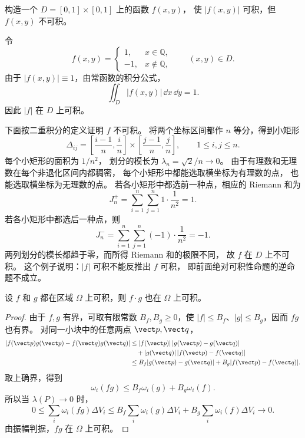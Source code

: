 \begin{problem}\label{p2-absolute-value-converse-counterexample}
构造一个 $D=[0,1]\times[0,1]$ 上的函数 $f(x,y)$，
使 $|f(x,y)|$ 可积，但 $f(x,y)$ 不可积。
\end{problem}
\begin{solution}
令
\[
f(x,y)=
\begin{cases}
1,&x\in\mathbb Q,\\
-1,&x\notin\mathbb Q,
\end{cases}
\qquad (x,y)\in D.
\]
由于 $|f(x,y)|\equiv1$，由常函数的积分公式，
\[
\iint_D|f(x,y)|\,\dd x\,\dd y=1.
\]
因此 $|f|$ 在 $D$ 上可积。

下面按二重积分的定义证明 $f$ 不可积。
将两个坐标区间都作 $n$ 等分，得到小矩形
\[
\Delta_{ij}=
\left[\frac{i-1}{n},\frac{i}{n}\right]
\times\left[\frac{j-1}{n},\frac{j}{n}\right],
\qquad 1\le i,j\le n.
\]
每个小矩形的面积为 $1/n^2$，
划分的模长为 $\lambda_n=\sqrt2/n\to0$。
由于有理数和无理数在每个非退化区间内都稠密，
每个小矩形中都能选取横坐标为有理数的点，
也能选取横坐标为无理数的点。
若各小矩形中都选前一种点，相应的 Riemann 和为
\[
J_n^+=\sum_{i=1}^n\sum_{j=1}^n1\cdot\frac1{n^2}=1.
\]
若各小矩形中都选后一种点，则
\[
J_n^-=\sum_{i=1}^n\sum_{j=1}^n(-1)\cdot\frac1{n^2}=-1.
\]
两列划分的模长都趋于零，而所得 Riemann 和的极限不同，
故 $f$ 在 $D$ 上不可积。
这个例子说明：$|f|$ 可积不能反推出 $f$ 可积，
即前面绝对可积性命题的逆命题不成立。
\end{solution}

\begin{proposition}[乘积可积性]\label{p2-integral-product}
设 $f$ 和 $g$ 都在区域 $\Omega$ 上可积，则 $f\cdot g$ 也在 $\Omega$ 上可积。
\end{proposition}
\begin{proof}
由于 $f,g$ 有界，可取有限常数 $B_f,B_g\ge0$，使
$|f|\le B_f$、$|g|\le B_g$，因而 $fg$ 也有界。
对同一小块中的任意两点 $\vect p,\vect q$，
\[
\begin{aligned}
|f(\vect p)g(\vect p)-f(\vect q)g(\vect q)|
&\le |f(\vect p)|\,|g(\vect p)-g(\vect q)|\\
&\quad+|g(\vect q)|\,|f(\vect p)-f(\vect q)|\\
&\le B_f|g(\vect p)-g(\vect q)|
+B_g|f(\vect p)-f(\vect q)|.
\end{aligned}
\]
取上确界，得到
\[
\omega_i(fg)\le B_f\omega_i(g)+B_g\omega_i(f).
\]
所以当 $\lambda(P)\to0$ 时，
\[
0\le\sum_i\omega_i(fg)\Delta V_i
\le B_f\sum_i\omega_i(g)\Delta V_i
+B_g\sum_i\omega_i(f)\Delta V_i\longrightarrow0.
\]
由振幅判据，$fg$ 在 $\Omega$ 上可积。
\end{proof}

